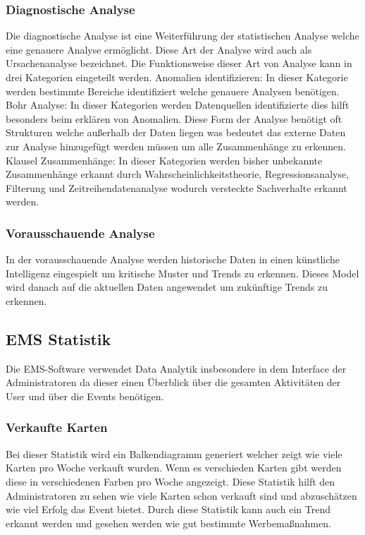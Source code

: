 			\subsubsection{Diagnostische Analyse}
				Die diagnostische Analyse ist eine Weiterführung der statistischen Analyse welche eine genauere Analyse ermöglicht. Diese Art der Analyse wird auch als Ursachenanalyse bezeichnet. Die Funktionsweise dieser Art von Analyse kann in drei Kategorien eingeteilt werden. \newline
				Anomalien identifizieren: In dieser Kategorie werden bestimmte Bereiche identifiziert welche genauere Analysen benötigen. \newline
				Bohr Analyse: In dieser Kategorien werden Datenquellen identifizierte dies hilft besonders beim erklären von Anomalien. Diese Form der Analyse benötigt oft Strukturen welche außerhalb der Daten liegen was bedeutet das externe Daten zur Analyse hinzugefügt werden müssen um alle Zusammenhänge zu erkennen.  \newline
				Klausel Zusammenhänge: In dieser Kategorien werden bisher unbekannte Zusammenhänge erkannt durch Wahrscheinlichkeitstheorie, Regressionsanalyse, Filterung und Zeitreihendatenanalyse wodurch versteckte Sachverhalte erkannt werden.  		
			
			\subsubsection{Vorausschauende Analyse}
				In der vorausschauende Analyse werden historische Daten in einen künstliche Intelligenz eingespielt um kritische Muster und Trends zu erkennen. Dieses Model wird danach auf die aktuellen Daten angewendet um zukünftige Trends zu erkennen. 
	
		\subsection{EMS Statistik}
			Die EMS-Software verwendet Data Analytik insbesondere in dem Interface der Administratoren da dieser einen Überblick über die gesamten Aktivitäten der User und über die Events benötigen.  
			
			\subsubsection{Verkaufte Karten}
				Bei dieser Statistik wird ein Balkendiagramm generiert welcher zeigt wie viele Karten pro Woche verkauft wurden. Wenn es verschieden Karten gibt werden diese in verschiedenen Farben pro Woche angezeigt. Diese Statistik hilft den Administratoren zu sehen wie viele Karten schon verkauft sind und abzuschätzen wie viel Erfolg das Event bietet. Durch diese Statistik kann auch ein Trend erkannt werden und gesehen werden wie gut bestimmte Werbemaßnahmen.
				
